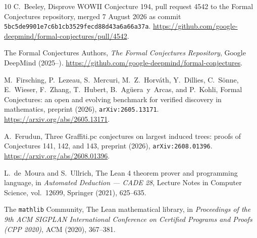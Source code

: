 \documentclass[11pt]{article}
\begin{document}
\begin{thebibliography}{10}
C.~Beeley,
\newblock Disprove {WOWII} Conjecture 194,
\newblock pull request 4542 to the Formal Conjectures repository, merged 7 August 2026 as
  commit \texttt{5bc5de9901e7c6b1cb3529fecd88d43a6a66a37a}.
\newblock \url{https://github.com/google-deepmind/formal-conjectures/pull/4542}.

The Formal Conjectures Authors,
\newblock \emph{The Formal Conjectures Repository}, Google {DeepMind} (2025--).
\newblock \url{https://github.com/google-deepmind/formal-conjectures}.

M.~Firsching, P.~Lezeau, S.~Mercuri, M.~Z.~Horv{\'a}th, Y.~Dillies, C.~S{\"o}nne,
  E.~Wieser, F.~Zhang, T.~Hubert, B.~Ag{\"u}era~y~Arcas, and P.~Kohli,
\newblock Formal {C}onjectures: an open and evolving benchmark for verified discovery in
  mathematics,
\newblock preprint (2026), \texttt{arXiv:2605.13171}.
\newblock \url{https://arxiv.org/abs/2605.13171}.

A.~Ferudun,
\newblock Three {G}raffiti.pc conjectures on largest induced trees: proofs of
  Conjectures 141, 142, and 143,
\newblock preprint (2026), \texttt{arXiv:2608.01396}.
\newblock \url{https://arxiv.org/abs/2608.01396}.

L.~de~Moura and S.~Ullrich,
\newblock The {L}ean 4 theorem prover and programming language,
\newblock in \emph{Automated Deduction --- CADE 28}, Lecture Notes in Computer Science,
  vol.~12699, Springer (2021), 625--635.

The \texttt{mathlib} Community,
\newblock The {L}ean mathematical library,
\newblock in \emph{Proceedings of the 9th ACM SIGPLAN International Conference on
  Certified Programs and Proofs (CPP 2020)}, ACM (2020), 367--381.

\end{thebibliography}
\end{document}

